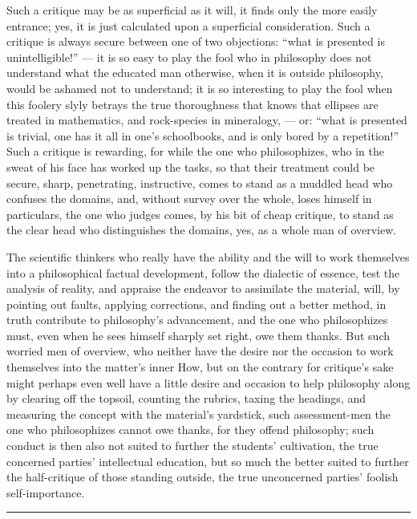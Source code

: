 \documentclass[12pt]{book}
\begin{document}
Such a critique may be as superficial as it will, it finds only the more easily entrance; yes, it is just
calculated upon a superficial consideration. Such a critique is always secure between one of two objections:
``what is presented is unintelligible!'' --- it is so easy to play the fool who in philosophy does not
understand what the educated man otherwise, when it is outside philosophy, would be ashamed not to
understand; it is so interesting to play the fool when this foolery slyly betrays the true thoroughness that
knows that ellipses are treated in mathematics, and rock-species in mineralogy, --- or: ``what is presented
is trivial, one has it all in one's schoolbooks, and is only bored by a repetition!'' Such a critique is
rewarding, for while the one who philosophizes, who in the sweat of his face has worked up the tasks, so
that their treatment could be secure, sharp, penetrating, instructive, comes to stand as a muddled head who
confuses the domains, and, without survey over the whole, loses himself in particulars, the one who judges
comes, by his bit of cheap critique, to stand as the clear head who distinguishes the domains, yes, as a
whole man of overview.

The scientific thinkers who really have the ability and the will to work themselves into a philosophical
factual development, follow the dialectic of essence, test the analysis of reality, and appraise the
endeavor to assimilate the material, will, by pointing out faults, applying corrections, and finding out a
better method, in truth contribute to philosophy's advancement, and the one who philosophizes must, even
when he sees himself sharply set right, owe them thanks. But such worried men of overview, who neither have
the desire nor the occasion to work themselves into the matter's inner How, but on the contrary for
critique's sake might perhaps even well have a little desire and occasion to help philosophy along by
clearing off the
topsoil, counting the rubrics, taxing the headings, and measuring the concept with the material's yardstick,
such assessment-men the one who philosophizes cannot owe thanks, for they offend philosophy; such conduct
is then also not suited to further the students' cultivation, the true concerned parties' intellectual
education, but so much the better suited to further the half-critique of those standing outside, the true
unconcerned parties' foolish self-importance.

\begin{center}\rule{0.35\linewidth}{0.4pt}\end{center}
\end{document}
